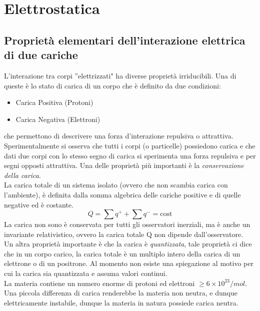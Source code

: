 \setcounter{chapter}{0}
\chapter{Elettrostatica}

\section{Propriet\`a elementari dell'interazione elettrica di due cariche}

L'interazione tra corpi ''elettrizzati" ha diverse propriet\`a irriducibili. Una di queste \`e lo stato di carica di un corpo che \`e definito da due condizioni:
\begin{itemize}
	\item Carica Positiva (Protoni)
	\item Carica Negativa (Elettroni)
\end{itemize}

che permettono di descrivere una forza d'interazione repulsiva o attrattiva. 
\\
Sperimentalmente si osserva che tutti i corpi (o particelle) possiedono carica e che dati due corpi con lo stesso segno di carica si sperimenta una forza repulsiva e per segni opposti attrattiva. Una delle propriet\`a pi\`u importanti \`e la \textit{conservazione della carica}.
\\
La carica totale di un sistema isolato (ovvero che non scambia carica con l'ambiente), \`e definita dalla somma algebrica delle cariche positive e di quelle negative ed \`e costante.
\begin{equation*}
	Q = \sum q^+ + \sum q^- = \text{cost}
\end{equation*} 
La carica non sono \`e conservata per tutti gli osservatori inerziali, ma \`e anche un invariante relativistico, ovvero la carica totale Q non dipende dall'osservatore.
\\
Un altra propriet\`a importante \`e che la carica \`e \textit{quantizzata}, tale propriet\`a ci dice che in un corpo carico, la carica totale \`e un multiplo intero della carica di un elettrone o di un positrone. Al momento non esiste una spiegazione al motivo per cui la carica sia quantizzata e assuma valori continui.
\\
La materia contiene un numero enorme di protoni ed elettroni $\geq 6 \times 10^{23}/mol$. Una piccola differenza di carica renderebbe la materia non neutra, e dunque elettricamente instabile, dunque la materia in natura possiede carica neutra.


